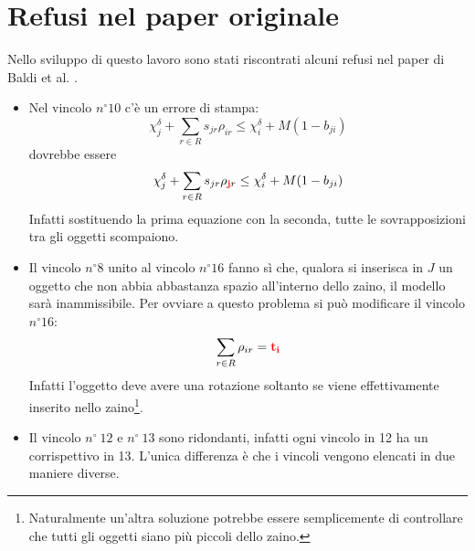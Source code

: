 \documentclass{scrartcl}
\begin{document}
\section{Refusi nel paper originale}
Nello sviluppo di questo lavoro sono stati riscontrati alcuni refusi nel paper di Baldi et al. \cite{Baldi20129802}.
\begin{itemize}
	\item Nel vincolo $n^\circ 10$ c'è un errore di stampa:
	$$
	\chi_j^\delta + \sum_{r\in R} s_{jr}\rho_{ir} \leq \chi_i^\delta + M(1-b_{ji})
	$$
	dovrebbe essere 
	$$
	\chi_j^\delta + \sum_{r\in R} s_{jr}\rho_{\mathbf{\color{red}j}r} \leq \chi_i^\delta + M(1-b_{ji})
	$$
	Infatti sostituendo la prima equazione con la seconda, tutte le sovrapposizioni tra gli oggetti scompaiono.
	\item Il vincolo $n^\circ 8$ unito al vincolo $n^\circ 16$ fanno sì che, qualora si inserisca in $J$ un oggetto che non abbia abbastanza spazio all'interno dello zaino, il modello sarà inammissibile. Per ovviare a questo problema si può modificare il vincolo $n^\circ 16$:
	$$
	\sum_{r \in R} \rho_{ir} = \color{red}\mathbf{t_i}
	$$
	Infatti l'oggetto deve avere una rotazione soltanto se viene effettivamente inserito nello zaino\footnote{ 
	Naturalmente un'altra soluzione potrebbe essere semplicemente di controllare che tutti gli oggetti siano più piccoli dello zaino.}. 
	\item Il vincolo $n^\circ\ 12$ e $n^\circ\ 13$ sono ridondanti, infatti ogni vincolo in 12 ha un corrispettivo in 13. L'unica differenza è che i vincoli vengono elencati in due maniere diverse.
\end{itemize}




\end{document}

